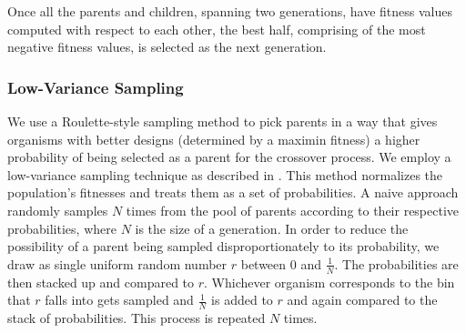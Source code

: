 \documentclass[letterpaper, 10 pt, conference]{ieeeconf}  %
\begin{document}
Once all the parents and children, spanning two generations, have fitness values computed with respect to each other, the best half, comprising of the most negative fitness values, is selected as the next generation.

\subsubsection{Low-Variance Sampling}

We use a Roulette-style sampling method to pick parents in a way that gives organisms with better designs (determined by a maximin fitness) a higher probability of being selected as a parent for the crossover process. We employ a low-variance sampling technique as described in \cite{Thrun2006}. This method normalizes the population's fitnesses and treats them as a set of probabilities. A naive approach randomly samples $N$ times from the pool of parents according to their respective probabilities, where $N$ is the size of a generation. In order to reduce the possibility of a parent being sampled disproportionately to its probability, we draw as single uniform random number $r$ between 0 and $\tfrac{1}{N}$. The probabilities are then stacked up and compared to $r$. Whichever organism corresponds to the bin that $r$ falls into gets sampled and $\tfrac{1}{N}$ is added to $r$ and again compared to the stack of probabilities. This process is repeated $N$ times.


\end{document}
